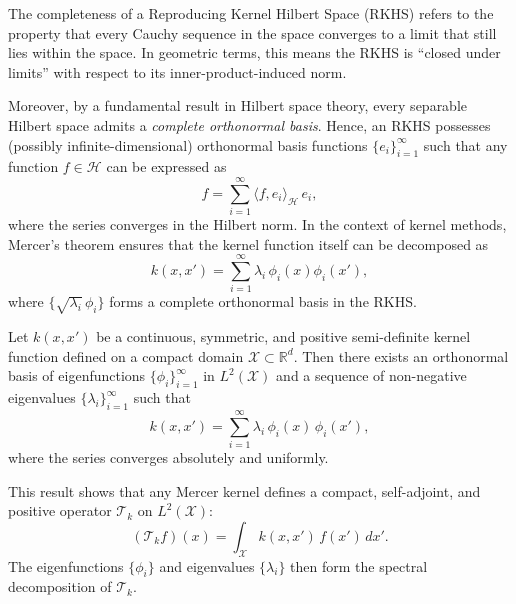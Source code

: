 \documentclass[../main]{subfiles}
\begin{document}
    \begin{note}
        The completeness of a Reproducing Kernel Hilbert Space (RKHS) refers to the property that every Cauchy sequence in the space converges to a limit that still lies within the space.  
        In geometric terms, this means the RKHS is ``closed under limits'' with respect to its inner-product-induced norm.
    
        Moreover, by a fundamental result in Hilbert space theory, every separable Hilbert space admits a \emph{complete orthonormal basis}.  
        Hence, an RKHS possesses (possibly infinite-dimensional) orthonormal basis functions 
        $\{e_i\}_{i=1}^{\infty}$ such that any function $f \in \mathcal{H}$ can be expressed as
        \begin{equation}
            f = \sum_{i=1}^{\infty} \langle f, e_i \rangle_{\mathcal{H}}\, e_i,
        \end{equation}
        where the series converges in the Hilbert norm.  
        In the context of kernel methods, Mercer’s theorem ensures that the kernel function
itself can be decomposed as
\begin{equation}
    k(x, x') = \sum_{i=1}^{\infty} \lambda_i\, \phi_i(x)\phi_i(x'),
\end{equation}
where $\{\sqrt{\lambda_i}\,\phi_i\}$ forms a complete orthonormal basis in the RKHS.
\begin{theorem}
    Let $k(x, x')$ be a continuous, symmetric, and positive semi-definite kernel function  
    defined on a compact domain $\mathcal{X} \subset \mathbb{R}^d$.  
    Then there exists an orthonormal basis of eigenfunctions  
    $\{\phi_i\}_{i=1}^{\infty}$ in $L^2(\mathcal{X})$ and a sequence of non-negative eigenvalues  
    $\{\lambda_i\}_{i=1}^{\infty}$ such that
    \begin{equation}
        k(x, x') = \sum_{i=1}^{\infty} \lambda_i\, \phi_i(x)\, \phi_i(x'),
    \end{equation}
    where the series converges absolutely and uniformly.
\end{theorem}
This result shows that any Mercer kernel defines a compact, self-adjoint, and positive 
    operator $\mathcal{T}_k$ on $L^2(\mathcal{X})$:
    \begin{equation}
        (\mathcal{T}_k f)(x) = \int_{\mathcal{X}} k(x, x')\, f(x')\, dx'.
    \end{equation}
    The eigenfunctions $\{\phi_i\}$ and eigenvalues $\{\lambda_i\}$ then form the spectral 
    decomposition of $\mathcal{T}_k$.



\end{note}
\end{document}
